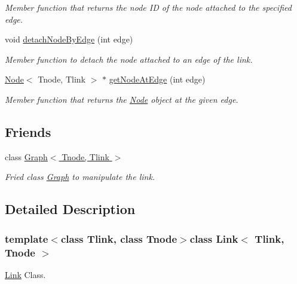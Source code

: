 \begin{DoxyCompactItemize}
\begin{DoxyCompactList}\small\item\em Member function that returns the node I\+D of the node attached to the specified edge. \end{DoxyCompactList}\item 
void \hyperlink{classLink_a847f85e9cf72ffa8f20acc3fad2f9eca}{detach\+Node\+By\+Edge} (int edge)
\begin{DoxyCompactList}\small\item\em Member function to detach the node attached to an edge of the link. \end{DoxyCompactList}\item 
\hyperlink{classNode}{Node}$<$ Tnode, Tlink $>$ $\ast$ \hyperlink{classLink_afd371e7c41ade7612eeb41cd5ec96921}{get\+Node\+At\+Edge} (int edge)
\begin{DoxyCompactList}\small\item\em Member function that returns the \hyperlink{classNode}{Node} object at the given edge. \end{DoxyCompactList}\end{DoxyCompactItemize}
\subsection*{Friends}
\begin{DoxyCompactItemize}
\item 
\hypertarget{classLink_a328a8512e23864fd93de7205c56d2c3f}{class \hyperlink{classLink_a328a8512e23864fd93de7205c56d2c3f}{Graph$<$ Tnode, Tlink $>$}}\label{classLink_a328a8512e23864fd93de7205c56d2c3f}

\begin{DoxyCompactList}\small\item\em Fried class \hyperlink{classGraph}{Graph} to manipulate the link. \end{DoxyCompactList}\end{DoxyCompactItemize}


\subsection{Detailed Description}
\subsubsection*{template$<$class Tlink, class Tnode$>$class Link$<$ Tlink, Tnode $>$}

\hyperlink{classLink}{Link} Class. 

